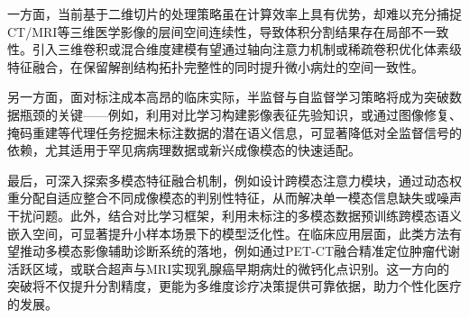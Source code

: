 一方面，当前基于二维切片的处理策略虽在计算效率上具有优势，却难以充分捕捉CT/MRI等三维医学影像的层间空间连续性，导致体积分割结果存在局部不一致性。引入三维卷积或混合维度建模有望通过轴向注意力机制或稀疏卷积优化体素级特征融合，在保留解剖结构拓扑完整性的同时提升微小病灶的空间一致性。

另一方面，面对标注成本高昂的临床实际，半监督与自监督学习策略将成为突破数据瓶颈的关键——例如，利用对比学习构建影像表征先验知识，或通过图像修复、掩码重建等代理任务挖掘未标注数据的潜在语义信息，可显著降低对全监督信号的依赖，尤其适用于罕见病病理数据或新兴成像模态的快速适配。

最后，可深入探索多模态特征融合机制，例如设计跨模态注意力模块，通过动态权重分配自适应整合不同成像模态的判别性特征，从而解决单一模态信息缺失或噪声干扰问题。此外，结合对比学习框架，利用未标注的多模态数据预训练跨模态语义嵌入空间，可显著提升小样本场景下的模型泛化性。在临床应用层面，此类方法有望推动多模态影像辅助诊断系统的落地，例如通过PET-CT融合精准定位肿瘤代谢活跃区域，或联合超声与MRI实现乳腺癌早期病灶的微钙化点识别。这一方向的突破将不仅提升分割精度，更能为多维度诊疗决策提供可靠依据，助力个性化医疗的发展。